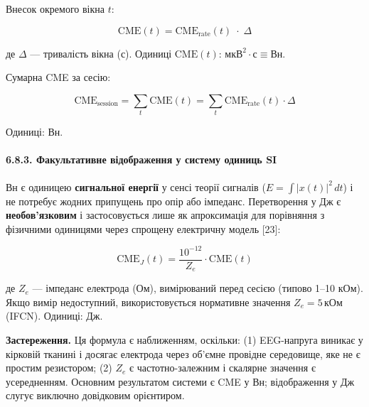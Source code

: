 \documentclass[12pt,a4paper]{article}
\begin{document}
Внесок окремого вікна \(t\):



\[\boxed{\;\text{CME}(t) = \text{CME}_{\text{rate}}(t) \;\cdot\; \Delta\;}\]



де \(\Delta\) --- тривалість вікна (с). Одиниці \(\text{CME}(t)\): \(\text{мкВ}^2 \cdot \text{с} \equiv \text{Вн}\).



Сумарна CME за сесію:



\[\text{CME}_{\text{session}} = \sum_{t} \text{CME}(t) = \sum_{t} \text{CME}_{\text{rate}}(t) \cdot \Delta\]



Одиниці: Вн.



\paragraph{6.8.3. Факультативне відображення у систему одиниць SI}\label{ux444ux430ux43aux443ux43bux44cux442ux430ux442ux438ux432ux43dux435-ux432ux456ux434ux43eux431ux440ux430ux436ux435ux43dux43dux44f-ux443-ux441ux438ux441ux442ux435ux43cux443-ux43eux434ux438ux43dux438ux446ux44c-si}



Вн є одиницею \textbf{сигнальної енергії} у сенсі теорії сигналів (\(E = \int |x(t)|^2\,dt\)) і не потребує жодних припущень про опір або імпеданс. Перетворення у Дж є \textbf{необов'язковим} і застосовується лише як апроксимація для порівняння з фізичними одиницями через спрощену електричну модель {[}23{]}:



\[\text{CME}_J(t) = \frac{10^{-12}}{Z_e} \cdot \text{CME}(t)\]



де \(Z_e\) --- імпеданс електрода (Ом), вимірюваний перед сесією (типово 1--10 кОм). Якщо вимір недоступний, використовується нормативне значення \(Z_e = 5\,\text{кОм}\) (IFCN). Одиниці: Дж.



\textbf{Застереження.} Ця формула є наближенням, оскільки: (1) EEG-напруга виникає у кірковій тканині і досягає електрода через об'ємне провідне середовище, яке не є простим резистором; (2) \(Z_e\) є частотно-залежним і скалярне значення є усередненням. Основним результатом системи є CME у Вн; відображення у Дж слугує виключно довідковим орієнтиром.
\end{document}
